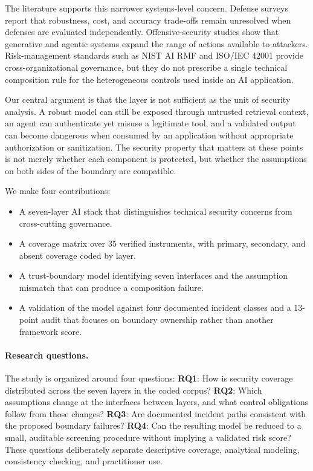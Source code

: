 \documentclass[runningheads]{llncs}
\begin{document}
The literature supports this narrower systems-level concern. Defense surveys report that robustness, cost, and accuracy trade-offs remain unresolved when defenses are evaluated independently. Offensive-security studies show that generative and agentic systems expand the range of actions available to attackers. Risk-management standards such as NIST AI RMF and ISO/IEC 42001 provide cross-organizational governance, but they do not prescribe a single technical composition rule for the heterogeneous controls used inside an AI application. \cite{wu2025defenses,ma2026advancements,nistrmf2023,nistgaiprofile2024,iso42001,iso23894}

Our central argument is that the layer is not sufficient as the unit of security analysis. A robust model can still be exposed through untrusted retrieval context, an agent can authenticate yet misuse a legitimate tool, and a validated output can become dangerous when consumed by an application without appropriate authorization or sanitization. The security property that matters at these points is not merely whether each component is protected, but whether the assumptions on both sides of the boundary are compatible.

We make four contributions:
\begin{itemize}
\item A seven-layer AI stack that distinguishes technical security concerns from cross-cutting governance.
\item A coverage matrix over 35 verified instruments, with primary, secondary, and absent coverage coded by layer.
\item A trust-boundary model identifying seven interfaces and the assumption mismatch that can produce a composition failure.
\item A validation of the model against four documented incident classes and a 13-point audit that focuses on boundary ownership rather than another framework score.
\end{itemize}

\paragraph{Research questions.}
The study is organized around four questions: \textbf{RQ1}: How is security coverage distributed across the seven layers in the coded corpus? \textbf{RQ2}: Which assumptions change at the interfaces between layers, and what control obligations follow from those changes? \textbf{RQ3}: Are documented incident paths consistent with the proposed boundary failures? \textbf{RQ4}: Can the resulting model be reduced to a small, auditable screening procedure without implying a validated risk score? These questions deliberately separate descriptive coverage, analytical modeling, consistency checking, and practitioner use.
\end{document}
